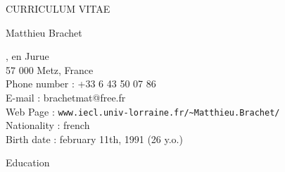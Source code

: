 \documentclass[10pt,a4paper]{report}
\begin{document}
\begin{center}
{\selectfont
\begin{LARGE}
CURRICULUM VITAE
\end{LARGE}

\begin{large}
Matthieu Brachet
\end{large}

\hrulefill
}
\end{center}

, en Jurue\\
57 000 Metz, France
\vspace{0.2cm}\\
Phone number : +33 6 43 50 07 86\\
E-mail : brachetmat@free.fr\\
Web Page : \verb?www.iecl.univ-lorraine.fr/~Matthieu.Brachet/?
\vspace{0.2cm}\\
Nationality : french\\
Birth date : february 11th, 1991 (26 y.o.)


\vspace{1cm}
\noindent
{\selectfont
\begin{Large}
Education
\end{Large}
\hrulefill
}

\vspace{0.6cm}
\end{document}
